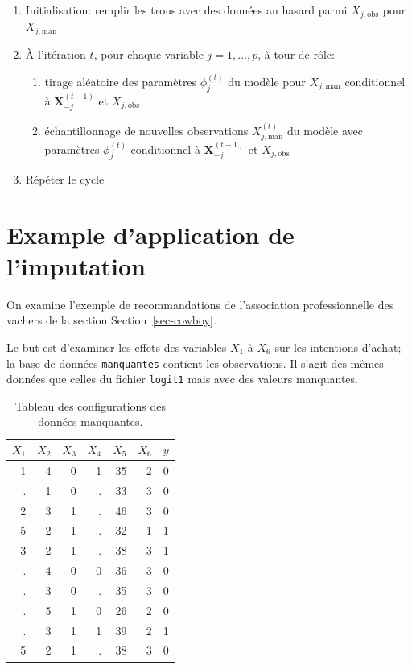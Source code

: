 \documentclass[
  11pt,
  letterpaper,
]{scrbook}
\providecommand{\tightlist}{%
  \setlength{\itemsep}{0pt}\setlength{\parskip}{0pt}}\usepackage{longtable,booktabs,array}
\theoremstyle{definition}
\theoremstyle{remark}
\begin{document}
\begin{enumerate}
\def\labelenumi{\arabic{enumi}.}
\tightlist
\item
  Initialisation: remplir les trous avec des données au hasard parmi
  \(X_{j, \text{obs}}\) pour \(X_{j, \text{man}}\)
\item
  À l'itération \(t\), pour chaque variable \(j=1, \ldots, p\), à tour
  de rôle:

  \begin{enumerate}
  \def\labelenumii{\alph{enumii})}
  \tightlist
  \item
    tirage aléatoire des paramètres \(\phi_j^{(t)}\) du modèle pour
    \(X_{j,\text{man}}\) conditionnel à \(\boldsymbol{X}_{-j}^{(t-1)}\)
    et \(X_{j, \text{obs}}\)
  \item
    échantillonnage de nouvelles observations \(X^{(t)}_{j,\text{man}}\)
    du modèle avec paramètres \(\phi_j^{(t)}\) conditionnel à
    \(\boldsymbol{X}_{-j}^{(t-1)}\) et \(X_{j, \text{obs}}\)
  \end{enumerate}
\item
  Répéter le cycle
\end{enumerate}

\hypertarget{example-dapplication-de-limputation}{%
\section{Example d'application de
l'imputation}\label{example-dapplication-de-limputation}}

On examine l'exemple de recommandations de l'association professionnelle
des vachers de la section Section~\ref{sec-cowboy}.

Le but est d'examiner les effets des variables \(X_1\) à \(X_6\) sur les
intentions d'achat; la base de données \texttt{manquantes} contient les
observations. Il s'agit des mêmes données que celles du fichier
\texttt{logit1} mais avec des valeurs manquantes.

\hypertarget{tbl-missing1r}{}
\begin{table}
\caption{\label{tbl-missing1r}Tableau des configurations des données manquantes. }\tabularnewline

\centering
\begin{tabular}{rrrrrrr}
\toprule
\(X_1\) & \(X_2\) & \(X_3\) & \(X_4\) & \(X_5\) & \(X_6\) & \(y\)\\
\midrule
1 & 4 & 0 & 1 & 35 & 2 & 0\\
. & 1 & 0 & . & 33 & 3 & 0\\
2 & 3 & 1 & . & 46 & 3 & 0\\
5 & 2 & 1 & . & 32 & 1 & 1\\
3 & 2 & 1 & . & 38 & 3 & 1\\
\addlinespace
. & 4 & 0 & 0 & 36 & 3 & 0\\
. & 3 & 0 & . & 35 & 3 & 0\\
. & 5 & 1 & 0 & 26 & 2 & 0\\
. & 3 & 1 & 1 & 39 & 2 & 1\\
5 & 2 & 1 & . & 38 & 3 & 0\\
\bottomrule
\end{tabular}
\end{table}
\end{document}
